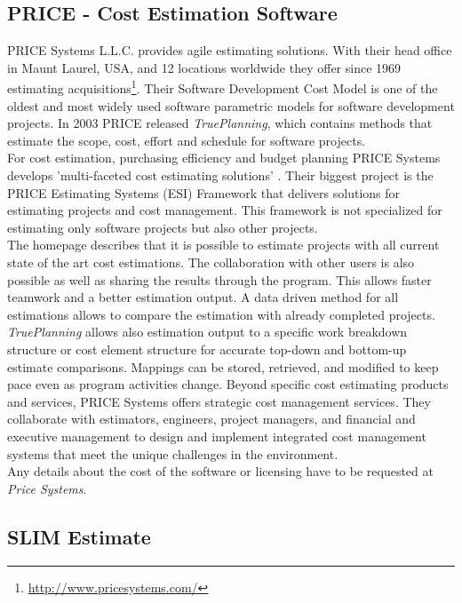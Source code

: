 \subsection{PRICE - Cost Estimation Software}

PRICE Systems L.L.C. provides agile estimating solutions. With their head office in Maunt Laurel, USA, and 12 locations worldwide they offer since 1969 estimating acquisitions\footnote{\url{http://www.pricesystems.com/}}. Their Software Development Cost Model is one of the oldest and most widely used software parametric models for software development projects. In 2003 PRICE released \textit{TruePlanning}, which contains methods that estimate the scope, cost, effort and schedule for software projects.
\\
For cost estimation, purchasing efficiency and budget planning PRICE Systems develops 'multi-faceted cost estimating solutions' \cite{pricesystems}. Their biggest project is the PRICE Estimating Systems (ESI) Framework that delivers solutions for estimating projects and cost management. This framework is not specialized for estimating only software projects but also other projects.
\\
The homepage describes that it is possible to estimate projects with all current state of the art cost estimations. The collaboration with other users is also possible as well as sharing the results through the program. This allows faster teamwork and a better estimation output. A data driven method for all estimations allows to compare the estimation with already completed projects. \textit{TruePlanning} allows also estimation output to a specific work breakdown structure or cost element structure for accurate top-down and bottom-up estimate comparisons. Mappings can be stored, retrieved, and modified to keep pace even as program activities change. Beyond specific cost estimating products and services, PRICE Systems offers strategic cost management services. They collaborate with estimators, engineers, project managers, and financial and executive management to design and implement integrated cost management systems that meet the unique challenges in the environment.
\\
Any details about the cost of the software or licensing have to be requested at \textit{Price Systems}.

\subsection{SLIM Estimate}

